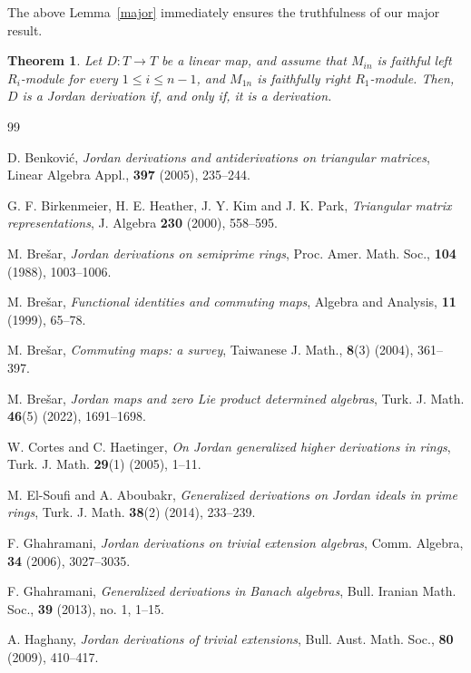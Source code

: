 \documentclass[12pt, reqno]{amsart}
\newtheorem{theorem}{Theorem}[section]
\theoremstyle{definition}
\numberwithin{equation}{section}
\begin{document}
The above Lemma~\ref{major} immediately ensures the truthfulness of our major result.

\begin{theorem} Let $D : T \longrightarrow T$ be a linear map, and assume that $M_{in}$ is faithful left $R_{i}$-module for every $1\leq i \leq n-1$, and $M_{1n}$ is faithfully right $R_1$-module. Then, $D$ is a Jordan derivation if, and only if, it is a derivation.
\end{theorem}



\begin{thebibliography}{99}

D. Benković, \emph{Jordan derivations and antiderivations on triangular matrices}, Linear Algebra Appl., \textbf{397} (2005), 235--244.

G. F. Birkenmeier, H. E. Heather, J. Y. Kim and J. K. Park, \emph{Triangular matrix representations}, J. Algebra \textbf{230} (2000), 558--595.

M. Brešar, \emph{Jordan derivations on semiprime rings}, Proc. Amer. Math. Soc., \textbf{104} (1988), 1003--1006.

M. Brešar, \emph{Functional identities and commuting maps}, Algebra and Analysis, \textbf{11} (1999), 65--78.

M. Brešar, \emph{Commuting maps: a survey}, Taiwanese J. Math., \textbf{8}(3) (2004), 361--397.

M. Brešar, \emph{Jordan maps and zero Lie product determined algebras}, Turk. J. Math. \textbf{46}(5) (2022), 1691--1698.

W. Cortes and C. Haetinger, \emph{On Jordan generalized higher derivations in rings}, Turk. J. Math. \textbf{29}(1) (2005), 1--11.

M. El-Soufi and A. Aboubakr, \emph{Generalized derivations on Jordan ideals in prime rings}, Turk. J. Math. \textbf{38}(2) (2014), 233--239.

F. Ghahramani, \emph{Jordan derivations on trivial extension algebras}, Comm. Algebra, \textbf{34} (2006), 3027--3035.

F. Ghahramani, \emph{Generalized derivations in Banach algebras}, Bull. Iranian Math. Soc., \textbf{39} (2013), no. 1, 1--15.

A. Haghany, \emph{Jordan derivations of trivial extensions}, Bull. Aust. Math. Soc., \textbf{80} (2009), 410--417.


\end{thebibliography}
\end{document}
